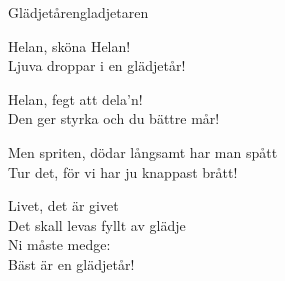 \begin{song}{Glädjetåren}{gladjetaren}
\begin{vers}
Helan, sköna Helan!\\
Ljuva droppar i en glädjetår!\\
\end{vers}
\begin{vers}
Helan, fegt att dela'n!\\
Den ger styrka och du bättre mår!\\
\end{vers}
\begin{vers}
Men spriten, dödar långsamt har man spått\\
Tur det, för vi har ju knappast brått!\\
\end{vers}
\begin{vers}
Livet, det är givet\\
Det skall levas fyllt av glädje\\
Ni måste medge:\\
Bäst är en glädjetår!\\
\end{vers}
\end{song}
